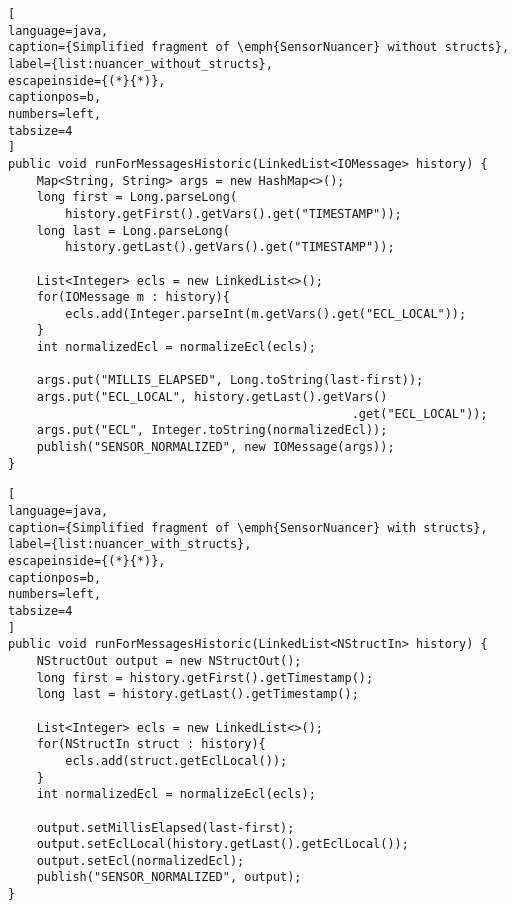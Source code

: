 
\begin{minipage}{\textwidth}
\begin{scriptsize}
\begin{lstlisting}[
language=java, 
caption={Simplified fragment of \emph{SensorNuancer} without structs}, 
label={list:nuancer_without_structs}, 
escapeinside={(*}{*)}, 
captionpos=b,
numbers=left,
tabsize=4
]
public void runForMessagesHistoric(LinkedList<IOMessage> history) {
	Map<String, String> args = new HashMap<>();
	long first = Long.parseLong(
		history.getFirst().getVars().get("TIMESTAMP"));
	long last = Long.parseLong(
		history.getLast().getVars().get("TIMESTAMP"));
			
	List<Integer> ecls = new LinkedList<>();
	for(IOMessage m : history){
		ecls.add(Integer.parseInt(m.getVars().get("ECL_LOCAL"));		
	}
	int normalizedEcl = normalizeEcl(ecls);
			
	args.put("MILLIS_ELAPSED", Long.toString(last-first));
	args.put("ECL_LOCAL", history.getLast().getVars()
	                                            .get("ECL_LOCAL"));
	args.put("ECL", Integer.toString(normalizedEcl));
	publish("SENSOR_NORMALIZED", new IOMessage(args));		
}
\end{lstlisting}
\begin{lstlisting}[
language=java, 
caption={Simplified fragment of \emph{SensorNuancer} with structs}, 
label={list:nuancer_with_structs}, 
escapeinside={(*}{*)}, 
captionpos=b,
numbers=left,
tabsize=4
]	
public void runForMessagesHistoric(LinkedList<NStructIn> history) {
	NStructOut output = new NStructOut();
	long first = history.getFirst().getTimestamp();
	long last = history.getLast().getTimestamp();
			
	List<Integer> ecls = new LinkedList<>();
	for(NStructIn struct : history){
		ecls.add(struct.getEclLocal());
	}
	int normalizedEcl = normalizeEcl(ecls);		
			
	output.setMillisElapsed(last-first);
	output.setEclLocal(history.getLast().getEclLocal());
	output.setEcl(normalizedEcl);				
	publish("SENSOR_NORMALIZED", output);	
}
\end{lstlisting}
\end{scriptsize}
\end{minipage}




